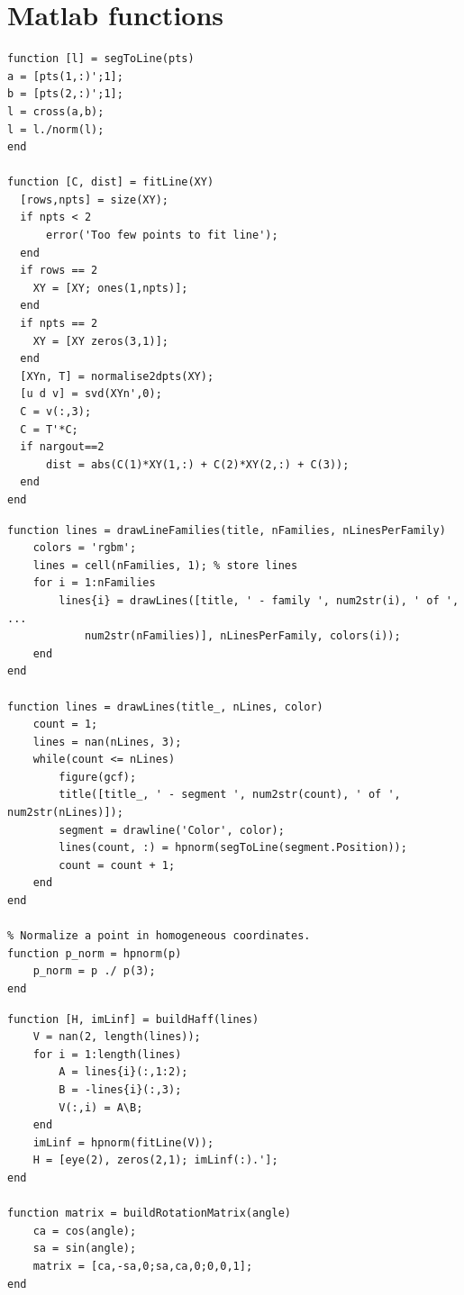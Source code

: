 \documentclass{Configuration_Files/PoliMi3i_thesis}
\begin{document}
\chapter{Matlab functions}
\label{appendix:functions}

\begin{verbatim}
function [l] = segToLine(pts)
a = [pts(1,:)';1];
b = [pts(2,:)';1];
l = cross(a,b);
l = l./norm(l);
end

function [C, dist] = fitLine(XY)
  [rows,npts] = size(XY);
  if npts < 2
      error('Too few points to fit line');
  end
  if rows == 2
    XY = [XY; ones(1,npts)];
  end
  if npts == 2
    XY = [XY zeros(3,1)]; 
  end
  [XYn, T] = normalise2dpts(XY);
  [u d v] = svd(XYn',0);
  C = v(:,3);
  C = T'*C;
  if nargout==2   
      dist = abs(C(1)*XY(1,:) + C(2)*XY(2,:) + C(3));
  end
end
\end{verbatim}
\newpage
\begin{verbatim}
function lines = drawLineFamilies(title, nFamilies, nLinesPerFamily)
    colors = 'rgbm';
    lines = cell(nFamilies, 1); % store lines
    for i = 1:nFamilies
        lines{i} = drawLines([title, ' - family ', num2str(i), ' of ', ...
        	num2str(nFamilies)], nLinesPerFamily, colors(i));
    end
end

function lines = drawLines(title_, nLines, color)
    count = 1;
    lines = nan(nLines, 3);
    while(count <= nLines)
        figure(gcf);
        title([title_, ' - segment ', num2str(count), ' of ', num2str(nLines)]);
        segment = drawline('Color', color);
        lines(count, :) = hpnorm(segToLine(segment.Position));
        count = count + 1;
    end
end

% Normalize a point in homogeneous coordinates.
function p_norm = hpnorm(p)
    p_norm = p ./ p(3);
end
\end{verbatim}
\newpage
\begin{verbatim}
function [H, imLinf] = buildHaff(lines)
    V = nan(2, length(lines));
    for i = 1:length(lines)
        A = lines{i}(:,1:2);
        B = -lines{i}(:,3);
        V(:,i) = A\B;
    end
    imLinf = hpnorm(fitLine(V));
    H = [eye(2), zeros(2,1); imLinf(:).'];
end

function matrix = buildRotationMatrix(angle)
    ca = cos(angle);
    sa = sin(angle);
    matrix = [ca,-sa,0;sa,ca,0;0,0,1];
end	
\end{verbatim}


{\hypersetup{linkcolor=black}
\listoffigures
}
\end{document}

